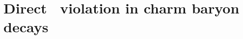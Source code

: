 \documentclass[a4paper,12pt]{memoir}
\begin{document}
\part{%
  Direct \texorpdfstring{\CP}{CP}\  violation in charm baryon decays
}
\label{chap:cpv}























\appendix
{}

\appendixpage*





\backmatter




\renewcommand{\bibname}{References}

\end{document}
